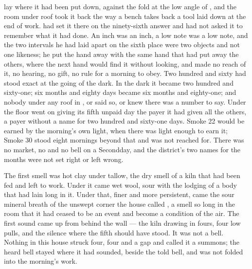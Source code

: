 
 lay where it had been put down, against the fold at the low angle of , and the room under  roof took it back the way a bench takes back a tool laid down at the end of work.  had set it there on the ninety-sixth answer and had not asked it to remember what it had done. An inch was an inch, a low note was a low note, and the two intervals he had laid apart on the sixth place were two objects and not one likeness; he put the hand away with the same hand that had put away the others, where the next hand would find it without looking, and made no reach of it, no hearing, no gift, no rule for a morning to obey. Two hundred and sixty had stood exact at the going of the dark. In the dark it became two hundred and sixty-one; six months and eighty days became six months and eighty-one; and nobody under any roof in ,  or  said so, or knew there was a number to say. Under the floor  went on giving its fifth unpaid day the payer it had given all the others, a payer without a name for two hundred and sixty-one days. Smoke 22 would be earned by the morning's own light, when there was light enough to earn it; Smoke 30 stood eight mornings beyond that and was not reached for. There was no market, no  and no bell on a Secondday, and the district's two names for the months were not set right or left wrong.

The first smell was hot clay under tallow, the dry smell of a kiln that had been fed and left to work. Under it came wet wool, sour with the lodging of a body that had lain long in it. Under that, finer and more persistent, came the sour mineral breath of the unswept corner the house called , a smell so long in the room that it had ceased to be an event and become a condition of the air. The first sound came up from  behind the wall --- the kiln drawing in fours, four low pulls, and the silence where the fifth should have stood. It was not a bell. Nothing in this house struck four, four and a gap and called it a summons; the heard bell stayed where it had sounded, beside the told bell, and was not folded into the morning's work.


